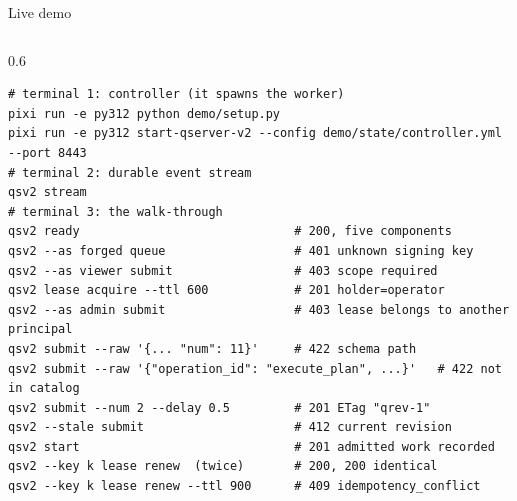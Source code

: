 \begin{frame}[fragile]{Live demo}
    \begin{columns}[T]
        \begin{column}{0.6\textwidth}
\begin{lstlisting}[style=http, basicstyle=\ttfamily\tiny, breaklines=false]
# terminal 1: controller (it spawns the worker)
pixi run -e py312 python demo/setup.py
pixi run -e py312 start-qserver-v2 --config demo/state/controller.yml --port 8443
# terminal 2: durable event stream
qsv2 stream
# terminal 3: the walk-through
qsv2 ready                              # 200, five components
qsv2 --as forged queue                  # 401 unknown signing key
qsv2 --as viewer submit                 # 403 scope required
qsv2 lease acquire --ttl 600            # 201 holder=operator
qsv2 --as admin submit                  # 403 lease belongs to another principal
qsv2 submit --raw '{... "num": 11}'     # 422 schema path
qsv2 submit --raw '{"operation_id": "execute_plan", ...}'   # 422 not in catalog
qsv2 submit --num 2 --delay 0.5         # 201 ETag "qrev-1"
qsv2 --stale submit                     # 412 current revision
qsv2 start                              # 201 admitted work recorded
qsv2 --key k lease renew  (twice)       # 200, 200 identical
qsv2 --key k lease renew --ttl 900      # 409 idempotency_conflict


\end{lstlisting}
\end{column}
\end{columns}
\end{frame}
